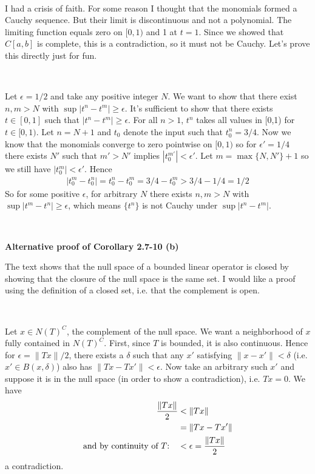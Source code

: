 \documentclass{article}
\newcommand{\norm}[1]{ \lVert #1 \rVert }
\begin{document}
\

I had a crisis of faith.
For some reason I thought that the monomials formed a Cauchy sequence. 
But their limit is discontinuous and not a polynomial. 
The limiting function equals zero on $[0,1)$ and 1 at $t=1$. 
Since we showed that $C[a,b]$ is complete, 
this is a contradiction,
so it must not be Cauchy. 
Let's prove this directly just for fun.

\

Let $\epsilon = 1/2$ and take any positive integer $N$.
We want to show that there exist $n,m > N$ with
$\sup |t^n - t^m| \geq \epsilon$.
It's sufficient to show that there exists $t \in [0,1]$
such that $|t^n - t^m| \geq \epsilon$. 
For all $n>1$, $t^n$ takes all values in [0,1) for $t \in [0,1)$. 
Let $n=N+1$ and $t_0$ denote the input such that $t_0^n = 3/4$. 
Now we know that the monomials converge to zero pointwise on $[0,1)$
so 
for $\epsilon' = 1/4$ there exists $N'$ such that $m'>N'$ implies 
$|t_0^{m'}| < \epsilon'$. Let $m=\max\{N,N'\}+1$ so we still have $|t_0^{m}| < \epsilon'$.
Hence 
\begin{align*}
  |t_0^m - t_0^n| = t_0^n - t_0^m = 3/4 - t_0^m > 3/4 - 1/4 = 1/2
\end{align*}
So for some positive $\epsilon$,
for arbitrary $N$ there exists $n,m>N$ with
$\sup |t^m - t^n| \geq \epsilon$,
which means $\{t^n\}$ is not Cauchy under $\sup|t^n - t^m|$. 

\

\textbf{Alternative proof of Corollary 2.7-10 (b)}

The text shows that the null space of a bounded linear operator
is closed by showing that the closure of the null space is the same set. 
I would like a proof using the definition of a closed set,
i.e. that the complement is open.

\

Let $x \in N(T)^C$, the complement of the null space.
We want a neighborhood of $x$ fully contained in $N(T)^C$. 
First, since $T$ is bounded, it is also continuous. 
Hence for $\epsilon = \norm{Tx}/2$, 
there exists a $\delta$ such that any $x'$ 
satisfying ${\norm{x - x'}<\delta}$ (i.e. ${x' \in B(x,\delta)}$)
also has ${\norm{Tx - Tx'} < \epsilon}$.
Now take an arbitrary such $x'$
and suppose it is in the null space
(in order to show a contradiction),
i.e. $Tx = 0$. 
We have
\begin{align*}
  \frac{\norm{Tx}}{2} &< \norm{Tx} \\
  &= \norm{Tx - Tx'} \\
  \text{and by continuity of $T$:\quad} &< \epsilon = \frac{\norm{Tx}}{2}
\end{align*}
a contradiction. 
\end{document}
